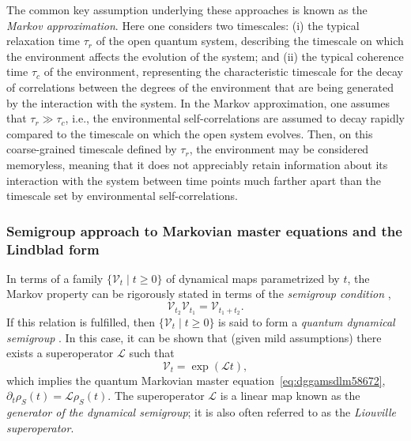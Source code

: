 \documentclass[3p,sort&compress]{elsarticle}
\newcommand{\op}[1]{#1}
\begin{document}
The common key assumption underlying these approaches is known as the \emph{Markov approximation}. Here one considers two timescales: (i) the typical relaxation time $\tau_r$ of the open quantum system, describing the timescale on which the environment affects the evolution of the system; and (ii) the typical coherence time $\tau_c$ of the environment, representing the characteristic timescale for the decay of correlations between the degrees of the environment that are being generated by the interaction with the system. In the Markov approximation, one assumes that $\tau_r \gg \tau_c$, i.e., the environmental self-correlations are assumed to decay rapidly compared to the timescale on which the open system evolves. Then, on this coarse-grained timescale defined by $\tau_r$, the environment may be considered memoryless, meaning that it does not appreciably retain information about its interaction with the system between time points much farther apart than the timescale set by environmental self-correlations. 

\subsubsection{\label{sec:semigr-deriv-mark}Semigroup approach to Markovian master equations and the Lindblad form}

In terms of a family $\{ \mathcal{V}_t \mid t \ge 0 \}$ of dynamical maps parametrized by $t$, the Markov property can be rigorously stated in terms of the \emph{semigroup condition} \cite{Lindblad:1976:um,Gorini:1976:tt,Gorini:1978:uf,Davies:1974:tw,Kossakowski:1972:tf,Alicki:2007:uu},
%
\begin{equation}
\label{eq:d4488m58672}
\mathcal{V}_{t_2}\mathcal{V}_{t_1}=\mathcal{V}_{t_1+t_2}.
\end{equation}
%
If this relation is fulfilled, then $\{ \mathcal{V}_t \mid t \ge 0 \}$ is said to form a \emph{quantum dynamical semigroup} \cite{Alicki:2007:uu}. In this case, it can be shown that  (given mild assumptions) there exists a superoperator $\mathcal{L}$ such that \cite{Alicki:2007:uu} 
%
\begin{equation}\label{eq:767n8m58672}
\mathcal{V}_t = \exp (\mathcal{L}t),
\end{equation}
%
which implies the quantum Markovian master equation~\eqref{eq:dggamsdlm58672}, $\partial_t \op{\rho}_S(t) = \mathcal{L}\op{\rho}_S(t)$.
The superoperator $\mathcal{L}$ is a linear map known as the \emph{generator of the dynamical semigroup}; it is also often referred to as the \emph{Liouville superoperator}.
\end{document}
